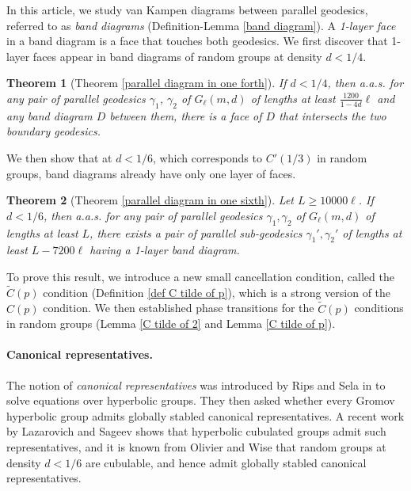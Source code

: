\documentclass[a4paper]{article}
\def\tilde{\widetilde}
\newtheorem*{thm*}{Theorem}
\theoremstyle{remark}
\begin{document}
In this article, we study van Kampen diagrams between parallel geodesics, referred to as \textit{band diagrams} (Definition-Lemma \ref{band diagram}). A \textit{1-layer face} in a band diagram is a face that touches both geodesics. We first discover that 1-layer faces appear in band diagrams of random groups at density $d<1/4$.

\begin{thm*}[Theorem \ref{parallel diagram in one forth}]
    If $d<1/4$, then a.a.s. for any pair of parallel geodesics $\gamma_1$, $\gamma_2$ of $G_\ell(m,d)$ of lengths at least $\frac{1200}{1-4d}\ell$ and any band diagram $D$ between them, there is a face of $D$ that intersects the two boundary geodesics.
\end{thm*}

We then show that at $d<1/6$, which corresponds to $C'(1/3)$ in random groups, band diagrams already have only one layer of faces.

\begin{thm*}[Theorem \ref{parallel diagram in one sixth}]
    Let $L\geq10000\ell$. If $d<1/6$, then a.a.s. for any pair of parallel geodesics $\gamma_1, \gamma_2$ of $G_\ell(m,d)$ of lengths at least $L$, there exists a pair of parallel sub-geodesics $\gamma_1',\gamma_2'$ of lengths at least $L-7200\ell$ having a 1-layer band diagram.
\end{thm*}

To prove this result, we introduce a new small cancellation condition, called the $\tilde C(p)$ condition (Definition \ref{def C tilde of p}), which is a strong version of the $C(p)$ condition. We then established phase transitions for the $\tilde C(p)$ conditions in random groups (Lemma \ref{C tilde of 2} and Lemma \ref{C tilde of p}).

\paragraph{Canonical representatives.} The notion of \textit{canonical representatives} was introduced by Rips and Sela in \cite{RS95} to solve equations over hyperbolic groups. They then asked whether every Gromov hyperbolic group admits globally stabled canonical representatives. A recent work by Lazarovich and Sageev \cite{LS24} shows that hyperbolic cubulated groups admit such representatives, and it is known from Olivier and Wise \cite{OW11} that random groups at density $d<1/6$ are cubulable, and hence admit globally stabled canonical representatives.
\end{document}
